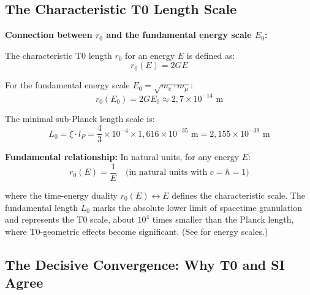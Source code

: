 	\subsection{The Characteristic T0 Length Scale}
	
	\begin{insight}
		\textbf{Connection between $r_0$ and the fundamental energy scale $E_0$:}
		
		The characteristic T0 length $r_0$ for an energy $E$ is defined as:
		\begin{equation}
			r_0(E) = 2GE
		\end{equation}
		
		For the fundamental energy scale $E_0 = \sqrt{m_e \cdot m_\mu}$:
		\begin{equation}
			r_0(E_0) = 2GE_0 \approx 2{,}7 \times 10^{-14} \text{ m}
		\end{equation}
		
		The minimal sub-Planck length scale is:
		\begin{equation}
			\boxed{L_0 = \xi \cdot l_P = \frac{4}{3} \times 10^{-4} \times 1{,}616 \times 10^{-35} \text{ m} = 2{,}155 \times 10^{-39} \text{ m}}
		\end{equation}
		
		\textbf{Fundamental relationship:} In natural units, for any energy $E$:
		\begin{equation}
			r_0(E) = \frac{1}{E} \quad \text{(in natural units with } c = \hbar = 1\text{)}
		\end{equation}
		
		where the time-energy duality $r_0(E) \leftrightarrow E$ defines the characteristic scale. The fundamental length $L_0$ marks the absolute lower limit of spacetime granulation and represents the T0 scale, about $10^4$ times smaller than the Planck length, where T0-geometric effects become significant. (See \cite{T0_energy_En} for energy scales.)
	\end{insight}
	
	\subsection{The Decisive Convergence: Why T0 and SI Agree}
	
